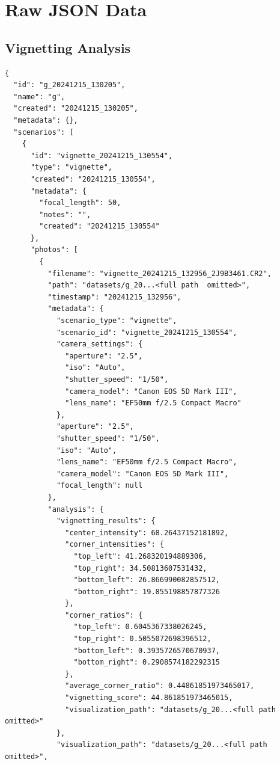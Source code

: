 \appendix

\chapter{Raw JSON Data}

\section{Vignetting Analysis}
\label{app:vignetting_json}
\begin{verbatim}
{
  "id": "g_20241215_130205",
  "name": "g",
  "created": "20241215_130205",
  "metadata": {},
  "scenarios": [
    {
      "id": "vignette_20241215_130554",
      "type": "vignette",
      "created": "20241215_130554",
      "metadata": {
        "focal_length": 50,
        "notes": "",
        "created": "20241215_130554"
      },
      "photos": [
        {
          "filename": "vignette_20241215_132956_2J9B3461.CR2",
          "path": "datasets/g_20...<full path  omitted>",
          "timestamp": "20241215_132956",
          "metadata": {
            "scenario_type": "vignette",
            "scenario_id": "vignette_20241215_130554",
            "camera_settings": {
              "aperture": "2.5",
              "iso": "Auto",
              "shutter_speed": "1/50",
              "camera_model": "Canon EOS 5D Mark III",
              "lens_name": "EF50mm f/2.5 Compact Macro"
            },
            "aperture": "2.5",
            "shutter_speed": "1/50",
            "iso": "Auto",
            "lens_name": "EF50mm f/2.5 Compact Macro",
            "camera_model": "Canon EOS 5D Mark III",
            "focal_length": null
          },
          "analysis": {
            "vignetting_results": {
              "center_intensity": 68.26437152181892,
              "corner_intensities": {
                "top_left": 41.268320194889306,
                "top_right": 34.50813607531432,
                "bottom_left": 26.866990082857512,
                "bottom_right": 19.855198857877326
              },
              "corner_ratios": {
                "top_left": 0.6045367338026245,
                "top_right": 0.5055072698396512,
                "bottom_left": 0.3935726570670937,
                "bottom_right": 0.2908574182292315
              },
              "average_corner_ratio": 0.44861851973465017,
              "vignetting_score": 44.861851973465015,
              "visualization_path": "datasets/g_20...<full path  omitted>"
            },
            "visualization_path": "datasets/g_20...<full path  omitted>",

\end{verbatim}
